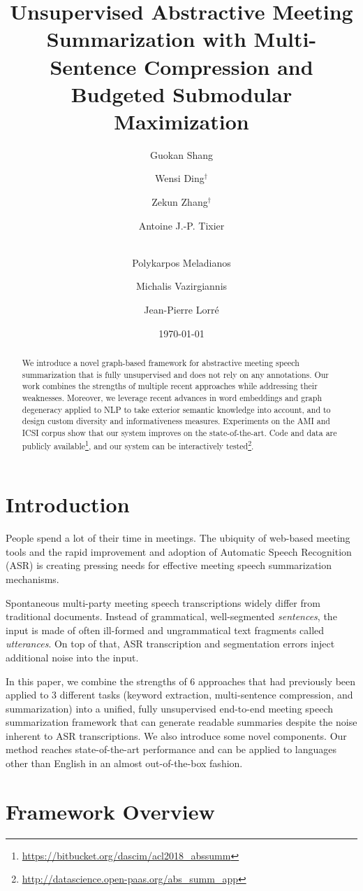 \documentclass[11pt,a4paper]{article}
\title{Unsupervised Abstractive Meeting Summarization with Multi-Sentence Compression and Budgeted Submodular Maximization\Thanks{ Published as a long paper at ACL 2018. $^\dagger$Work done as part of 3$\mathrm{^{rd}}$ year project, with equal contribution.}}
\author[1,2]{Guokan Shang}
\author[1]{Wensi Ding$^\dagger$}
\author[1]{Zekun Zhang$^\dagger$}
\author[1]{Antoine J.-P. Tixier}
\author[1,3]{\\Polykarpos Meladianos}
\author[1,3]{Michalis Vazirgiannis}
\author[2]{Jean-Pierre Lorr\'e}
\affil[1]{\'Ecole Polytechnique, $^\mathrm{2}$Linagora, $^\mathrm{3}$AUEB}
\date{\today}
\begin{document}
\maketitle
\begin{abstract} 
We introduce a novel graph-based framework for abstractive meeting speech summarization that is fully unsupervised and does not rely on any annotations. Our work combines the strengths of multiple recent approaches while addressing their weaknesses. 
Moreover, we leverage recent advances in word embeddings and graph degeneracy applied to NLP to take exterior semantic knowledge into account, and to design custom diversity and informativeness measures. Experiments on the AMI and ICSI  corpus show that our system improves on the state-of-the-art. Code and data are publicly available\footnote{\tiny{\url{https://bitbucket.org/dascim/acl2018_abssumm}}}, and our system can be interactively tested\footnote{\tiny{\url{http://datascience.open-paas.org/abs_summ_app}}}.
\end{abstract}

\section{Introduction}
People spend a lot of their time in meetings. The ubiquity of web-based meeting tools and the rapid improvement and adoption of Automatic Speech Recognition (ASR) is creating pressing needs for effective meeting speech summarization mechanisms.

Spontaneous multi-party meeting speech transcriptions widely differ from traditional documents. Instead of grammatical, well-segmented \textit{sentences}, the input is made of often ill-formed and ungrammatical text fragments called \textit{utterances}. On top of that, ASR transcription and segmentation errors inject additional noise into the input.

In this paper, we combine the strengths of 6 approaches that had previously been applied to 3 different tasks (keyword extraction, multi-sentence compression, and summarization) into a unified, fully unsupervised end-to-end meeting speech summarization framework that can generate readable summaries despite the noise inherent to ASR transcriptions. We also introduce some novel components. Our method reaches state-of-the-art performance and can be applied to languages other than English in an almost out-of-the-box fashion.

\section{Framework Overview}
\end{document}
